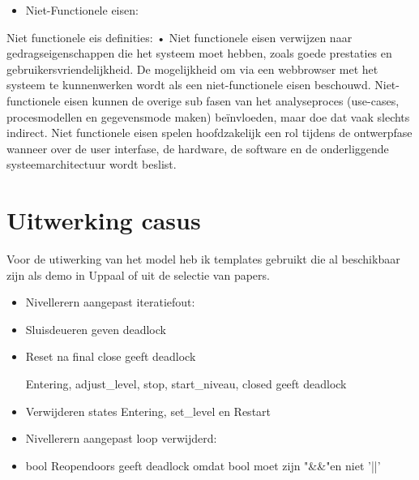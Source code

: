 \documentclass[a4paper,12pt]{article}
\begin{document}
\begin{itemize}

  \item Niet-Functionele eisen:
\end{itemize}
Niet functionele eis definities:
•	Niet functionele eisen verwijzen naar gedragseigenschappen die het systeem moet hebben, zoals goede prestaties en gebruikersvriendelijkheid. De mogelijkheid om via een webbrowser met het systeem te kunnenwerken wordt als een niet-functionele eisen beschouwd. Niet-functionele eisen kunnen de overige sub fasen van het analyseproces (use-cases, procesmodellen en gegevensmode maken) beïnvloeden, maar doe dat vaak slechts indirect. Niet functionele eisen spelen hoofdzakelijk een rol tijdens de ontwerpfase wanneer over de user interfase, de hardware, de software en de onderliggende systeemarchitectuur wordt beslist.





\clearpage
\newpage
\section{Uitwerking casus}

Voor de utiwerking van het model heb ik templates gebruikt die al beschikbaar zijn als demo in Uppaal of uit de selectie van papers.



\begin{itemize}
  \item Nivellerern aangepast iteratiefout:
  \item Sluisdeueren geven deadlock
  \item Reset na final close geeft deadlock
  \item [Entering, adjust_level, stop, start_niveau,] closed geeft deadlock
  \item Verwijderen states Entering, set_level en Restart
  \item Nivellerern aangepast loop verwijderd:
  \item bool Reopendoors geeft deadlock omdat bool moet zijn "&&"en niet '||'

  

\end{itemize}
\end{document}
